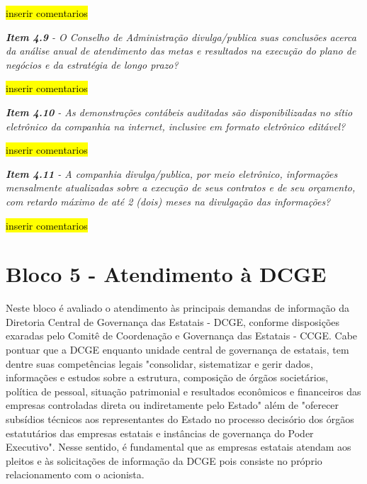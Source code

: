 \hl{inserir comentarios}

\begin{framed}
\noindent\textit{\textbf{Item 4.9} - O Conselho de Administração divulga/publica suas conclusões acerca da análise anual de atendimento das metas e resultados na execução do plano de negócios e da estratégia de longo prazo?}
\end{framed}

\hl{inserir comentarios}

\begin{framed}
\noindent\textit{\textbf{Item 4.10} - As demonstrações contábeis auditadas  são disponibilizadas no sítio eletrônico da companhia na internet, inclusive em formato eletrônico editável?}
\end{framed}

\hl{inserir comentarios}

\begin{framed}
\noindent\textit{\textbf{Item 4.11} - A companhia divulga/publica, por meio eletrônico, informações mensalmente atualizadas sobre a execução de seus contratos e de seu orçamento, com retardo máximo de até 2 (dois) meses na divulgação das informações?}
\end{framed}

\hl{inserir comentarios}

\section{Bloco 5 - Atendimento à DCGE}
Neste bloco é avaliado o atendimento às principais demandas de informação da Diretoria Central de Governança das Estatais - DCGE, conforme disposições exaradas pelo Comitê de Coordenação e Governança das Estatais - CCGE.
Cabe pontuar que a DCGE enquanto unidade central de governança de estatais, tem dentre suas competências legais "consolidar, sistematizar e gerir dados, informações e estudos sobre a estrutura, composição de órgãos societários, política de pessoal, situação patrimonial e resultados econômicos e financeiros das empresas controladas direta ou indiretamente pelo Estado" além de "oferecer subsídios técnicos aos representantes do Estado no processo decisório dos órgãos estatutários das empresas estatais e instâncias de governança do Poder Executivo". Nesse sentido, é fundamental que as empresas estatais atendam aos pleitos e às solicitações de informação da DCGE pois consiste no próprio relacionamento com o acionista.

